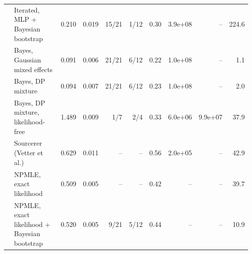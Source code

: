 \begin{tabular}{llrrrrrrrr}
 & Iterated, MLP + Bayesian bootstrap & 0.210 & 0.019 & 15/21 & 1/12 & 0.30 & 3.9e+08 & -- & 224.6 \\
 & Bayes, Gaussian mixed effects & 0.091 & 0.006 & 21/21 & 6/12 & 0.22 & 1.0e+08 & -- & 1.1 \\
 & Bayes, DP mixture & 0.094 & 0.007 & 21/21 & 6/12 & 0.23 & 1.0e+08 & -- & 2.0 \\
 & Bayes, DP mixture, likelihood-free & 1.489 & 0.009 & 1/7 & 2/4 & 0.33 & 6.0e+06 & 9.9e+07 & 37.9 \\
 & Sourcerer (Vetter et al.) & 0.629 & 0.011 & -- & -- & 0.56 & 2.0e+05 & -- & 42.9 \\
 & NPMLE, exact likelihood & 0.509 & 0.005 & -- & -- & 0.42 & -- & -- & 39.7 \\
 & NPMLE, exact likelihood + Bayesian bootstrap & 0.520 & 0.005 & 9/21 & 5/12 & 0.44 & -- & -- & 10.9 \\
\bottomrule
\end{tabular}

